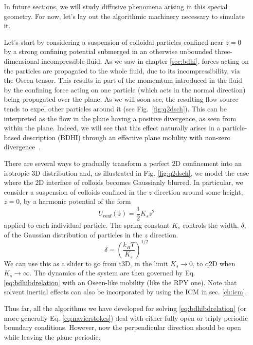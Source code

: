 \documentclass[ twoside,openright,titlepage,numbers=noenddot,%
headinclude,footinclude,cleardoublepage=empty,abstract=on,
BCOR=5mm,paper=b5,fontsize=11pt, dvipsnames
]{scrreprt}
\newcommand{\kT}{k_B T}
\newcommand{\half}{\frac{1}{2}}
\begin{document}
In future sections, we will study diffusive phenomena arising in this special geometry. For now, let's lay out the algorithmic machinery necessary to simulate it.

Let's start by considering a suspension of colloidal particles confined near $z=0$ by a strong confining potential submerged in an otherwise unbounded three-dimensional incompressible fluid. As we saw in chapter \ref{sec:bdhi}, forces acting on the particles are propagated to the whole fluid, due to its incompressibility, via the Oseen tensor. This results in part of the momemtum introduced in the fluid by the confining force acting on one particle (which acts in the normal direction) being propagated over the plane. As we will soon see, the resulting flow source tends to expel other particles around it (see Fig.~\ref{fig:q2dsch}). This can be interpreted as the flow in the plane having a positive divergence, as seen from within the plane. Indeed, we will see that this effect naturally arises in a particle-based description (\gls{BDHI}) through an effective plane mobility with non-zero divergence~\cite{Pelaez2017}.

There are several ways to gradually transform a perfect 2D confinement into an isotropic 3D distribution and, as illustrated in Fig. \ref{fig:q2dsch}, we model the case where the 2D interface of colloids becomes Gaussianly blurred. In particular, we consider a suspension of colloids confined in the $z$ direction around some height, $z=0$, by a harmonic potential of the form
\begin{equation}
  \label{eq:q2Dconf}
U_{\text{conf}}(z)=\half K_sz^2
\end{equation}
applied to each individual particle.
The spring constant $K_s$ controls the width, $\delta$, of the Gaussian distribution of particles in the $z$ direction.
\begin{equation}
  \delta = \left(\frac{\kT}{K_s}\right)^{1/2}
\end{equation}
We can use this as a slider to go from t3D, in the limit $K_s\rightarrow 0$, to q2D when $K_s\rightarrow\infty$.
The dynamics of the system are then governed by Eq. \eqref{eq:bdhibdrelation} with an Oseen-like mobility (like the \gls{RPY} one). Note that solvent inertial effects can also be incorporated by using the \gls{ICM} in sec. \ref{ch:icm}.

Thus far, all the algorithms we have developed for solving \eqref{eq:bdhibdrelation} (or more generally Eq. \eqref{eq:navierstokes}) deal with either fully open or triply periodic boundary conditions. However, now the perpendicular direction should be open while leaving the plane periodic.
\end{document}

